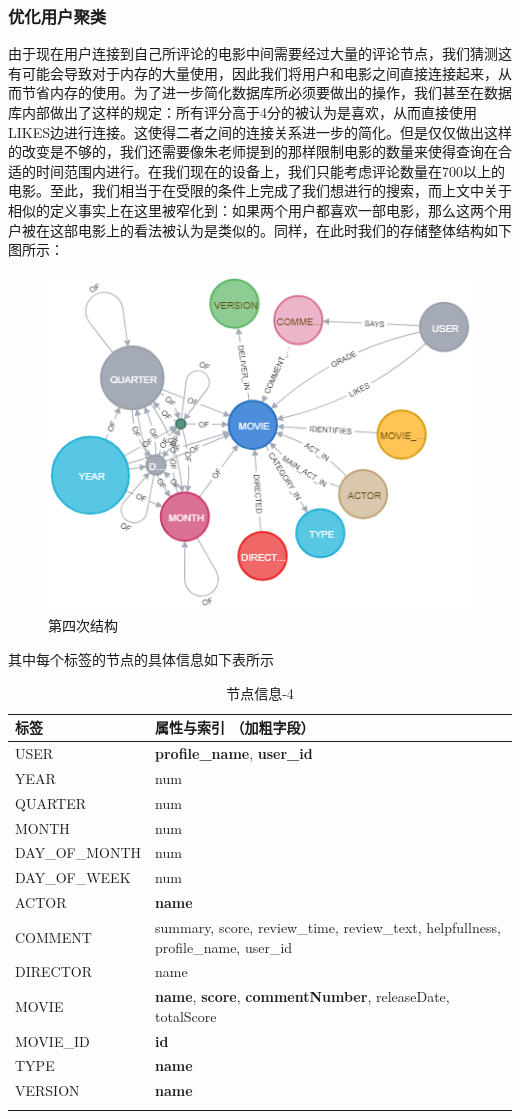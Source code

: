 \documentclass{ctexrep}
\begin{document}
	\subsubsection{优化用户聚类} \label{neo:4}
	由于现在用户连接到自己所评论的电影中间需要经过大量的评论节点，我们猜测这有可能会导致对于内存的大量使用，因此我们将用户和电影之间直接连接起来，从而节省内存的使用。为了进一步简化数据库所必须要做出的操作，我们甚至在数据库内部做出了这样的规定：所有评分高于4分的被认为是喜欢，从而直接使用LIKES边进行连接。这使得二者之间的连接关系进一步的简化。但是仅仅做出这样的改变是不够的，我们还需要像朱老师提到的那样限制电影的数量来使得查询在合适的时间范围内进行。在我们现在的设备上，我们只能考虑评论数量在700以上的电影。至此，我们相当于在受限的条件上完成了我们想进行的搜索，而上文中关于相似的定义事实上在这里被窄化到：如果两个用户都喜欢一部电影，那么这两个用户被在这部电影上的看法被认为是类似的。同样，在此时我们的存储整体结构如下图所示：
	\begin{figure}[H]
		\centering
		\includegraphics[width=0.7\linewidth]{img/graph4}
		\caption{第四次结构}
		\label{fig:graph4}
	\end{figure}
	其中每个标签的节点的具体信息如下表所示\begin{longtable}{l|p{8cm}}
		\hline
		标签 & 属性与索引 （加粗字段） \\
		\hline
		\hline
		USER &\textbf{ profile\_name}, \textbf{user\_id} \\
		YEAR & num\\
		QUARTER & num \\
		MONTH & num\\
		DAY\_OF\_MONTH & num\\
		DAY\_OF\_WEEK & num \\
		ACTOR & \textbf{name} \\
		COMMENT & summary, score, review\_time, review\_text, helpfullness, profile\_name, user\_id \\
		DIRECTOR & name\\
		MOVIE & \textbf{name}, \textbf{score}, \textbf{commentNumber}, releaseDate, totalScore \\
		MOVIE\_ID & \textbf{id} \\
		TYPE & \textbf{name}\\
		VERSION & \textbf{name}\\
		\hline
		\caption{节点信息-4}
	\end{longtable}
\end{document}
